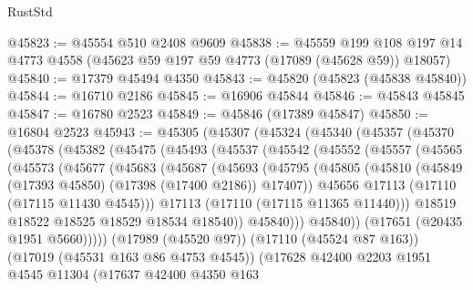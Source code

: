 \begin{lexlean}{RustStd}
\begin{coremodule}
@45823 := @45554 @510 @2408 @9609
@45838 := @45559
    @199
    @108
    @197
    @14
    @4773
    @4558
    (@45623 @59 @197 @59 @4773 (@17089 (@45628 @59)) @18057)
@45840 := @17379 @45494 @4350
@45843 := @45820 (@45823 (@45838 @45840))
@45844 := @16710 @2186
@45845 := @16906 @45844
@45846 := @45843 @45845
@45847 := @16780 @2523
@45849 := @45846 (@17389 @45847)
@45850 := @16804 @2523
@45943 := @45305
    (@45307
      (@45324
        (@45340
          (@45357
            (@45370
              (@45378
                (@45382
                  (@45475
                    (@45493
                      (@45537
                        (@45542
                          (@45552
                            (@45557
                              (@45565
                                (@45573
                                  (@45677
                                    (@45683
                                      (@45687
                                        (@45693
                                          (@45795
                                            (@45805
                                              (@45810
                                                (@45849
                                                  (@17393 @45850)
                                                  (@17398 (@17400 @2186))
                                                  @17407))
                                              @45656
                                              @17113
                                              (@17110 (@17115 @11430 @4545)))
                                            @17113
                                            (@17110 (@17115 @11365 @11440)))
                                          @18519
                                          @18522
                                          @18525
                                          @18529
                                          @18534
                                          @18540))
                                      @45840)))
                                @45840))
                            (@17651 (@20435 @1951 @5660)))))
                      (@17989 (@45520 @97))
                      (@17110 (@45524 @87 @163))
                      (@17019 (@45531 @163 @86 @4753 @4545))
                      (@17628
                        @42400
                        @2203
                        @1951
                        @4545
                        @11304
                        (@17637
                          @42400
                          @4350
                          @163

\end{coremodule}
\end{lexlean}
